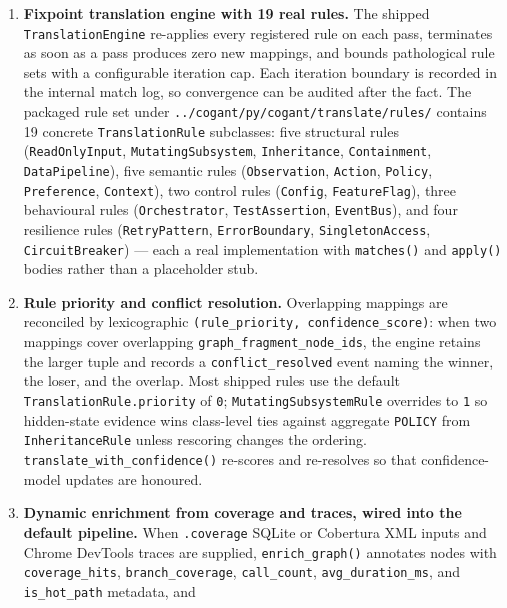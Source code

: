 \documentclass[
]{article}
\providecommand{\tightlist}{%
  \setlength{\itemsep}{0pt}\setlength{\parskip}{0pt}}
\begin{document}
\begin{enumerate}
\def\labelenumi{\arabic{enumi}.}
\tightlist
\item
  \textbf{Fixpoint translation engine with 19 real rules.} The shipped
  \texttt{TranslationEngine} re-applies every registered rule on each
  pass, terminates as soon as a pass produces zero new mappings, and
  bounds pathological rule sets with a configurable iteration cap. Each
  iteration boundary is recorded in the internal match log, so
  convergence can be audited after the fact. The packaged rule set under
  \texttt{../cogant/py/cogant/translate/rules/} contains 19 concrete
  \texttt{TranslationRule} subclasses: five structural rules
  (\texttt{ReadOnlyInput}, \texttt{MutatingSubsystem},
  \texttt{Inheritance}, \texttt{Containment}, \texttt{DataPipeline}),
  five semantic rules (\texttt{Observation}, \texttt{Action},
  \texttt{Policy}, \texttt{Preference}, \texttt{Context}), two control
  rules (\texttt{Config}, \texttt{FeatureFlag}), three behavioural rules
  (\texttt{Orchestrator}, \texttt{TestAssertion}, \texttt{EventBus}),
  and four resilience rules (\texttt{RetryPattern},
  \texttt{ErrorBoundary}, \texttt{SingletonAccess},
  \texttt{CircuitBreaker}) --- each a real implementation with
  \texttt{matches()} and \texttt{apply()} bodies rather than a
  placeholder stub.
\item
  \textbf{Rule priority and conflict resolution.} Overlapping mappings
  are reconciled by lexicographic
  \texttt{(rule\_priority,\ confidence\_score)}: when two mappings cover
  overlapping \texttt{graph\_fragment\_node\_ids}, the engine retains
  the larger tuple and records a \texttt{conflict\_resolved} event
  naming the winner, the loser, and the overlap. Most shipped rules use
  the default \texttt{TranslationRule.priority} of \texttt{0};
  \texttt{MutatingSubsystemRule} overrides to \texttt{1} so hidden-state
  evidence wins class-level ties against aggregate \texttt{POLICY} from
  \texttt{InheritanceRule} unless rescoring changes the ordering.
  \texttt{translate\_with\_confidence()} re-scores and re-resolves so
  that confidence-model updates are honoured.
\item
  \textbf{Dynamic enrichment from coverage and traces, wired into the
  default pipeline.} When \texttt{.coverage} SQLite or Cobertura XML
  inputs and Chrome DevTools traces are supplied,
  \texttt{enrich\_graph()} annotates nodes with \texttt{coverage\_hits},
  \texttt{branch\_coverage}, \texttt{call\_count},
  \texttt{avg\_duration\_ms}, and \texttt{is\_hot\_path} metadata, and

\end{enumerate}
\end{document}
